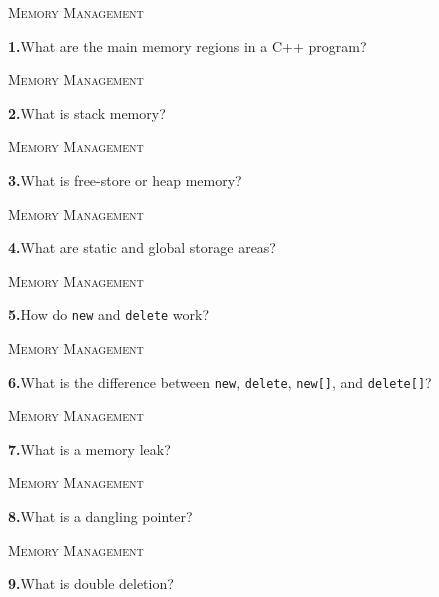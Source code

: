 \documentclass[11pt,a4paper]{article}
\newenvironment{questionblock}{%
  \begin{minipage}[t][0.455\textheight][t]{\textwidth}%
  \raggedright\small
}{%
  \vfill
  \end{minipage}%
}
\newcommand{\sectionlabel}[1]{\textsc{#1}\par\vspace{0.35em}}
\newcommand{\questionnumber}[1]{\textbf{#1.}\enspace}
\begin{document}
\newpage
\begin{questionblock}
\sectionlabel{Memory Management}
\questionnumber{1}What are the main memory regions in a C++ program?\par
\end{questionblock}
\vspace*{0.04\textheight}
\begin{questionblock}
\sectionlabel{Memory Management}
\questionnumber{2}What is stack memory?\par
\end{questionblock}
\newpage
\begin{questionblock}
\sectionlabel{Memory Management}
\questionnumber{3}What is free-store or heap memory?\par
\end{questionblock}
\vspace*{0.04\textheight}
\begin{questionblock}
\sectionlabel{Memory Management}
\questionnumber{4}What are static and global storage areas?\par
\end{questionblock}
\newpage
\begin{questionblock}
\sectionlabel{Memory Management}
\questionnumber{5}How do \verb|new| and \verb|delete| work?\par
\end{questionblock}
\vspace*{0.04\textheight}
\begin{questionblock}
\sectionlabel{Memory Management}
\questionnumber{6}What is the difference between \verb|new|, \verb|delete|, \verb|new[]|, and \verb|delete[]|?\par
\end{questionblock}
\newpage
\begin{questionblock}
\sectionlabel{Memory Management}
\questionnumber{7}What is a memory leak?\par
\end{questionblock}
\vspace*{0.04\textheight}
\begin{questionblock}
\sectionlabel{Memory Management}
\questionnumber{8}What is a dangling pointer?\par
\end{questionblock}
\newpage
\begin{questionblock}
\sectionlabel{Memory Management}
\questionnumber{9}What is double deletion?\par
\end{questionblock}
\end{document}
